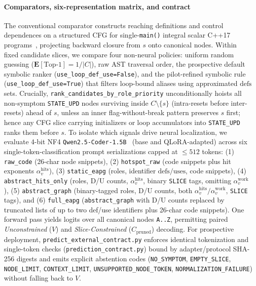 \paragraph{Comparators, six-representation matrix, and contract}
The conventional comparator constructs reaching definitions and control dependences on a structured CFG for single-\texttt{main()} integral scalar C++17 programs~\cite{weiser1981slicing}, projecting backward closure from $s$ onto canonical nodes. Within fixed candidate slices, we compare four non-neural policies: uniform random guessing ($\mathbf{E}[\mathrm{Top\text{-}1}]=1/|C|$), raw AST traversal order, the prospective default symbolic ranker (\nolinkurl{use_loop_def_use=False}), and the pilot-refined symbolic rule (\nolinkurl{use_loop_def_use=True}) that filters loop-bound aliases using approximated $\mathrm{defs}$ sets. Crucially, \nolinkurl{rank_candidates_by_role_priority} unconditionally hoists all non-symptom \texttt{STATE\_UPD} nodes surviving inside $C \setminus \{s\}$ (intra-resets before inter-resets) ahead of $s$, unless an inner flag-without-break pattern preserves $s$ first; hence any CFG slice carrying initializers or loop accumulators into \texttt{STATE\_UPD} ranks them before $s$. To isolate which signals drive neural localization, we evaluate 4-bit NF4 \texttt{Qwen2.5-Coder-1.5B}~\cite{hui2024qwen,dettmers2023qlora} (base and QLoRA-adapted) across six single-token-classification prompt serializations capped at $\le 512$ tokens: (1) \nolinkurl{raw_code} (26-char node snippets), (2) \nolinkurl{hotspot_raw} (code snippets plus hit exponents $\alpha_v^{\mathrm{hits}}$), (3) \nolinkurl{static_eapg} (roles, identifier $\mathrm{defs}/\mathrm{uses}$, code snippets), (4) \nolinkurl{abstract_hits_only} (roles, D/U counts, $\alpha_v^{\mathrm{hits}}$, binary \texttt{SLICE} tags, omitting $\alpha_v^{\mathrm{work}}$), (5) \nolinkurl{abstract_graph} (binary-tagged roles, D/U counts, both $\alpha_v^{\mathrm{hits}}/\alpha_v^{\mathrm{work}}$, \texttt{SLICE} tags), and (6) \nolinkurl{full_eapg} (\nolinkurl{abstract_graph} with D/U counts replaced by truncated lists of up to two def/use identifiers plus 26-char code snippets). One forward pass yields logits over all canonical nodes \texttt{A..Z}, permitting paired \emph{Unconstrained} ($V$) and \emph{Slice-Constrained} ($C_{\mathrm{pruned}}$) decoding. For prospective deployment, \nolinkurl{predict_external_contract.py} enforces identical tokenization and single-token checks (\nolinkurl{prediction_contract.py}) bound by adapter/protocol SHA-256 digests and emits explicit abstention codes (\nolinkurl{NO_SYMPTOM}, \nolinkurl{EMPTY_SLICE}, \nolinkurl{NODE_LIMIT}, \nolinkurl{CONTEXT_LIMIT}, \nolinkurl{UNSUPPORTED_NODE_TOKEN}, \nolinkurl{NORMALIZATION_FAILURE}) without falling back to $V$.

